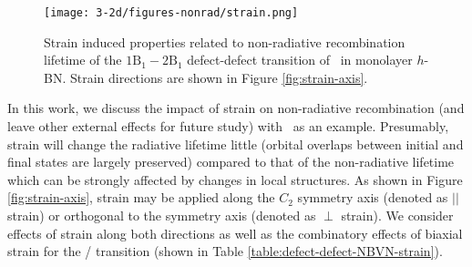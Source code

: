 \begin{figure}
    \centering
  \texttt{[image: 3-2d/figures-nonrad/strain.png]}
  \caption{Strain induced properties related to non-radiative recombination lifetime of the $1\mathrm{B}_1-2\mathrm{B}_1$ defect-defect transition of \NBVN\ in monolayer $h$-BN. Strain directions are shown in Figure \ref{fig:strain-axis}.}
  \label{fig:NBVN-strain}
\end{figure}


In this work, we discuss the impact of strain on non-radiative recombination (and leave other external effects for future study) with \NBVN\ as an example.
Presumably, strain will change the radiative lifetime little (orbital overlaps between initial and final states are largely preserved) compared to that of the non-radiative lifetime which can be strongly affected by changes in local structures.
As shown in Figure \ref{fig:strain-axis}, strain may be applied along the $C_{2}$ symmetry axis (denoted as $||$ strain) or  orthogonal to the symmetry axis (denoted as $\perp$ strain). We consider effects of strain along both directions as well as the combinatory effects of biaxial strain for the / transition (shown in Table \ref{table:defect-defect-NBVN-strain}).

